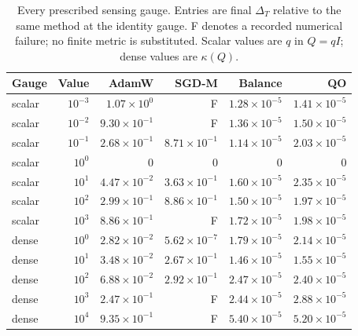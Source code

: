 \begin{table}[ht]
\centering\small
\caption{Every prescribed sensing gauge. Entries are final $\Delta_T$ relative to the same method at the identity gauge. F denotes a recorded numerical failure; no finite metric is substituted. Scalar values are $q$ in $Q=qI$; dense values are $\kappa(Q)$.}
\label{tab:fresh-gauge-cases}
\begin{tabular}{lrrrrr}
\toprule Gauge & Value & AdamW & SGD-M & Balance & QO\\\midrule
scalar & $10^{-3}$ & $1.07\!\times\!10^{0}$ & \textsf{F} & $1.28\!\times\!10^{-5}$ & $1.41\!\times\!10^{-5}$\\
scalar & $10^{-2}$ & $9.30\!\times\!10^{-1}$ & \textsf{F} & $1.36\!\times\!10^{-5}$ & $1.50\!\times\!10^{-5}$\\
scalar & $10^{-1}$ & $2.68\!\times\!10^{-1}$ & $8.71\!\times\!10^{-1}$ & $1.14\!\times\!10^{-5}$ & $2.03\!\times\!10^{-5}$\\
scalar & $10^{0}$ & 0 & 0 & 0 & 0\\
scalar & $10^{1}$ & $4.47\!\times\!10^{-2}$ & $3.63\!\times\!10^{-1}$ & $1.60\!\times\!10^{-5}$ & $2.35\!\times\!10^{-5}$\\
scalar & $10^{2}$ & $2.99\!\times\!10^{-1}$ & $8.86\!\times\!10^{-1}$ & $1.50\!\times\!10^{-5}$ & $1.97\!\times\!10^{-5}$\\
scalar & $10^{3}$ & $8.86\!\times\!10^{-1}$ & \textsf{F} & $1.72\!\times\!10^{-5}$ & $1.98\!\times\!10^{-5}$\\
dense & $10^{0}$ & $2.82\!\times\!10^{-2}$ & $5.62\!\times\!10^{-7}$ & $1.79\!\times\!10^{-5}$ & $2.14\!\times\!10^{-5}$\\
dense & $10^{1}$ & $3.48\!\times\!10^{-2}$ & $2.67\!\times\!10^{-1}$ & $1.46\!\times\!10^{-5}$ & $1.55\!\times\!10^{-5}$\\
dense & $10^{2}$ & $6.88\!\times\!10^{-2}$ & $2.92\!\times\!10^{-1}$ & $2.47\!\times\!10^{-5}$ & $2.40\!\times\!10^{-5}$\\
dense & $10^{3}$ & $2.47\!\times\!10^{-1}$ & \textsf{F} & $2.44\!\times\!10^{-5}$ & $2.88\!\times\!10^{-5}$\\
dense & $10^{4}$ & $9.35\!\times\!10^{-1}$ & \textsf{F} & $5.40\!\times\!10^{-5}$ & $5.20\!\times\!10^{-5}$\\
\bottomrule
\end{tabular}
\end{table}
